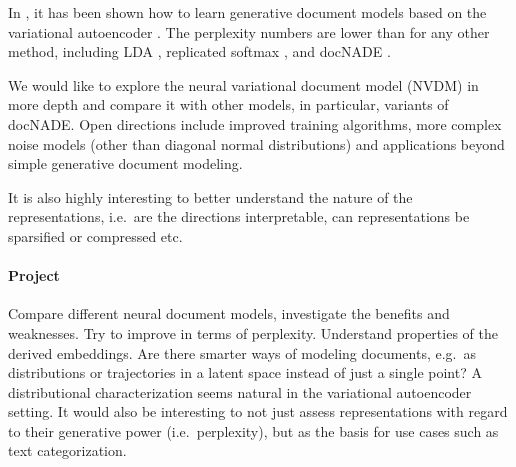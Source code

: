 \documentclass{article}
\begin{document}
In \cite{miao2015neural}, it has been shown how to learn generative document models based on the variational autoencoder \cite{kingma2013auto,rezende2014stochastic}. The perplexity numbers are lower than for any other method, including LDA \cite{blei2003latent}, replicated softmax \cite{hinton2009replicated}, and docNADE \cite{larochelle2012neural}. 

We would like to explore the neural variational document model (NVDM) in more depth and compare it with other models, in particular, variants of docNADE. Open directions include improved  training algorithms, more complex noise models (other than diagonal normal distributions) and applications beyond simple generative document modeling.
 
It is also highly interesting  to better understand the nature of the representations, i.e.~are the directions interpretable, can representations be sparsified or compressed etc. 

\paragraph{Project}

Compare different neural document models, investigate the benefits and weaknesses. Try to improve in terms of perplexity. Understand properties of the derived embeddings. Are there smarter ways of modeling documents, e.g.~as distributions or trajectories in a latent space instead of just a single point? A distributional characterization seems natural in the variational autoencoder setting. It would also be interesting to not just assess representations with regard to their generative power (i.e.~perplexity), but as the basis for use cases such as text categorization. 



\end{document}
